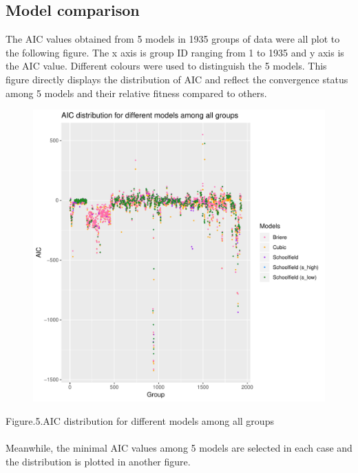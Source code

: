 \documentclass[12pt,a4paper]{article}
\begin{document}
\subsection{Model comparison}
The AIC values obtained from 5 models in 1935 groups of data were all plot to the following figure. The x axis is group ID ranging from 1 to 1935 and y axis is the AIC value. Different colours were used to distinguish the 5 models. This figure directly displays the distribution of AIC and reflect the convergence status among 5 models and their relative fitness compared to others. 
\begin{figure}[H]
\centering
\includegraphics[width=\textwidth]{scatter_AIC.pdf}
\end{figure}
Figure.5.AIC distribution for different models among all groups
\\
\\
Meanwhile, the minimal AIC values among 5 models are selected in each case and the distribution is plotted in another figure. 
\end{document}
